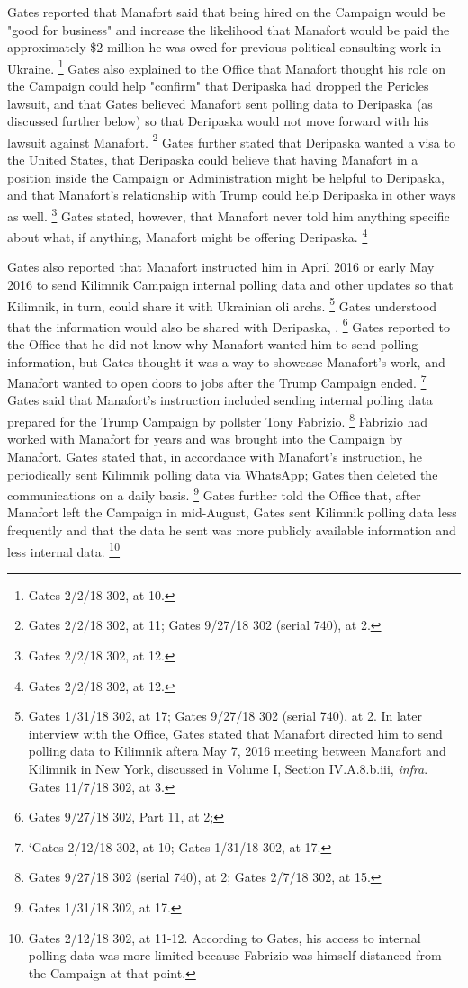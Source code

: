 Gates reported that Manafort said that being hired on the Campaign would be "good for business" and increase the likelihood that Manafort would be paid the approximately \$2 million he was owed for previous political consulting work in Ukraine.%
\footnote{Gates 2/2/18 302, at 10.}
Gates also explained to the Office that Manafort thought his role on the Campaign could help "confirm" that Deripaska had dropped the Pericles lawsuit, and that Gates believed Manafort sent polling data to Deripaska (as discussed further below) so that Deripaska would not move forward with his lawsuit against Manafort.%
\footnote{Gates 2/2/18 302, at 11;
Gates 9/27/18 302 (serial 740), at 2.}
Gates further stated that Deripaska wanted a visa to the United States, that Deripaska could believe that having Manafort in a position inside the Campaign or Administration might be helpful to Deripaska, and that Manafort's relationship with Trump could help Deripaska in other ways as well.%
\footnote{Gates 2/2/18 302, at 12.}
Gates stated, however, that Manafort never told him anything specific about what, if anything, Manafort might be offering Deripaska.%
\footnote{Gates 2/2/18 302, at 12.}

Gates also reported that Manafort instructed him in April 2016 or early May 2016 to send Kilimnik Campaign internal polling data and other updates so that Kilimnik, in turn, could share it with Ukrainian oli archs.%
\footnote{Gates 1/31/18 302, at 17;
Gates 9/27/18 302 (serial 740), at 2.
In later interview with the Office, Gates stated that Manafort directed him to send polling data to Kilimnik aftera May 7, 2016 meeting between Manafort and Kilimnik in New York, discussed in Volume I, Section IV.A.8.b.iii, \textit{infra}.
Gates 11/7/18 302, at 3.}
Gates understood that the information would also be shared with Deripaska,
.%
\footnote{Gates 9/27/18 302, Part 11, at 2; }
Gates reported to the Office that he did not know why Manafort wanted him to send polling information, but Gates thought it was a way to showcase Manafort's work, and Manafort wanted to open doors to jobs after the Trump Campaign ended.%
\footnote{‘Gates 2/12/18 302, at 10;
Gates 1/31/18 302, at 17.}
Gates said that Manafort's instruction included sending internal polling data prepared for the Trump Campaign by pollster Tony Fabrizio.%
\footnote{Gates 9/27/18 302 (serial 740), at 2;
Gates 2/7/18 302, at 15.}
Fabrizio had worked with Manafort for years and was brought into the Campaign by Manafort.
Gates stated that, in accordance with Manafort's instruction, he periodically sent Kilimnik polling data via WhatsApp; Gates then deleted the communications on a daily basis.%
\footnote{Gates 1/31/18 302, at 17.}
Gates further told the Office that, after Manafort left the Campaign in mid-August, Gates sent Kilimnik polling data less frequently and that the data he sent was more publicly available information and less internal data.%
\footnote{Gates 2/12/18 302, at 11-12.
According to Gates, his access to internal polling data was more limited because Fabrizio was himself distanced from the Campaign at that point.}

